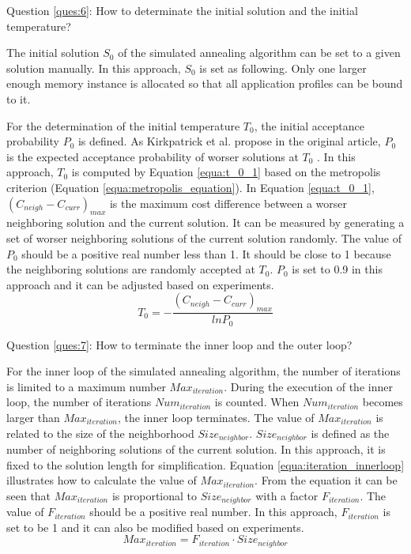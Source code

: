 		Question \ref{ques:6}: How to determinate the initial solution and the
		initial temperature?
		
		The initial solution $S_{0}$ of the simulated annealing algorithm can be set
		to a given solution manually.
		In this approach, $S_{0}$ is set as following.
		Only one larger enough memory instance is allocated so that all application
		profiles can be bound to it.
		
		For the determination of the initial temperature $T_{0}$, the initial acceptance
		probability $P_{0}$ is defined.
		As Kirkpatrick et al. propose in the original article,
		$P_{0}$ is the expected acceptance probability of worser solutions at $T_{0}$
		\cite{10.2307/1690046}.
		In this approach, $T_{0}$ is computed by Equation \ref{equa:t_0_1} based
		on the metropolis criterion (Equation \ref{equa:metropolis_equation}).
		In Equation \ref{equa:t_0_1}, $\left( C_{neigh}-C_{curr} \right)_{max}$
		is the maximum cost difference between a worser neighboring solution and the current
		solution.
		It can be measured by generating a set of worser neighboring solutions of the
		current solution randomly.
		The value of $P_{0}$ should be a positive real number less than 1.
		It should be close to 1 because the neighboring solutions are randomly
		accepted at $T_{0}$.
		$P_{0}$ is set to 0.9 in this approach and it can be adjusted based on experiments.
		\begin{equation}
		\label{equa:t_0_1}
			T_{0}= - \frac{\left( C_{neigh}-C_{curr} \right)_{max} }{ln{P_{0}}}
		\end{equation}
		
		Question \ref{ques:7}: How to terminate the inner loop and the outer loop?
		
		For the inner loop of the simulated annealing algorithm, the
		number of iterations is limited to a maximum number $Max_{iteration}$.
		During the execution of the inner loop, the number of iterations
		$Num_{iteration}$ is counted.
		When $Num_{iteration}$ becomes larger than $Max_{iteration}$, the inner
		loop terminates.
		The value of $Max_{iteration}$ is related to the size of the
		neighborhood $Size_{neighbor}$. $Size_{neighbor}$ is defined as the number
		of neighboring solutions of the current solution.
		In this approach, it is fixed to the solution length for simplification.
		Equation \ref{equa:iteration_innerloop} illustrates how to calculate the
		value of $Max_{iteration}$.
		From the equation it can be seen that $Max_{iteration}$ is proportional
		to $Size_{neighbor}$ with a factor $F_{iteration}$.
		The value of $F_{iteration}$ should be a positive real number.
		In this approach, $F_{iteration}$ is set to be 1 and it can also be
		modified based on experiments.
		\begin{equation}
		\label{equa:iteration_innerloop}
			Max_{iteration}=F_{iteration} \cdot Size_{neighbor}
		\end{equation}
		
